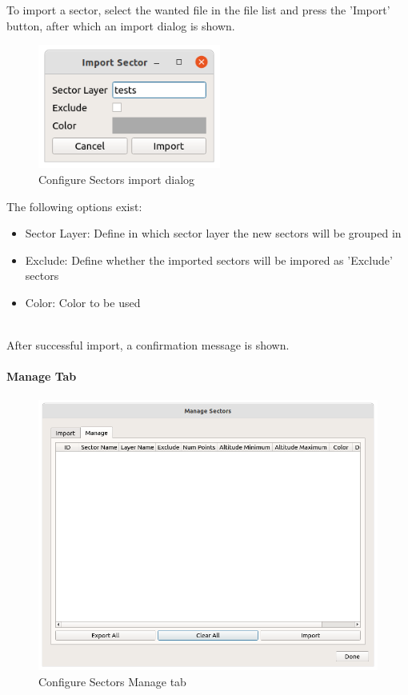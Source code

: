 To import a sector, select the wanted file in the file list and press the 'Import' button, after which an import dialog is shown. \\

\begin{figure}[H]
    \includegraphics[width=6cm]{figures/configure_sectors_import_dialog.png}
  \caption{Configure Sectors import dialog}
\end{figure}

The following options exist:
\begin{itemize}
\item Sector Layer: Define in which sector layer the new sectors will be grouped in
\item Exclude: Define whether the imported sectors will be impored as 'Exclude' sectors
\item Color: Color to be used
\end{itemize}
\ \\

After successful import, a confirmation message is shown. \\

\paragraph {Manage Tab}
\label{sec:ui_configure_sectors_manage}

\begin{figure}[H]
    \includegraphics[width=15cm]{figures/configure_sectors_manage.png}
  \caption{Configure Sectors Manage tab}
\end{figure}

